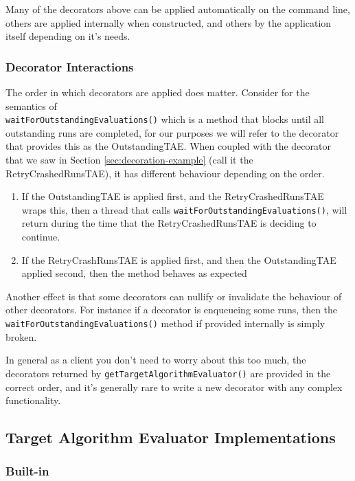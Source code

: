 \documentclass[11pt,letterpaper,oneside]{article}
\begin{document}
Many of the decorators above can be applied automatically on the command line, others are applied internally when constructed, and others by the application itself depending on it's needs.

\subsubsection{Decorator Interactions}

The order in which decorators are applied does matter. Consider for the semantics of \\ \texttt{waitForOutstandingEvaluations()} which is a method that blocks until all outstanding runs are completed, for our purposes we will refer to the decorator that provides this as the OutstandingTAE. When coupled with the decorator that we saw in Section \ref{sec:decoration-example} (call it the RetryCrashedRunsTAE), it has different behaviour depending on the order.

\begin{enumerate}
\item If the OutstandingTAE is applied first, and the RetryCrashedRunsTAE wraps this, then a thread that calls \texttt{waitForOutstandingEvaluations()}, will return during the time that the RetryCrashedRunsTAE is deciding to continue.
\item If the RetryCrashRunsTAE is applied first, and then the OutstandingTAE applied second, then the method behaves as expected
\end{enumerate}

Another effect is that some decorators can nullify or invalidate the behaviour of other decorators. For instance if a decorator is enqueueing some runs, then the \texttt{waitForOutstandingEvaluations()} method if provided internally is simply broken. 

In general as a client you don't need to worry about this too much, the decorators returned by \texttt{getTargetAlgorithmEvaluator()} are provided in the correct order, and it's generally rare to write a new decorator with any complex functionality.

\subsection{Target Algorithm Evaluator Implementations}

\subsubsection{Built-in}
\end{document}
